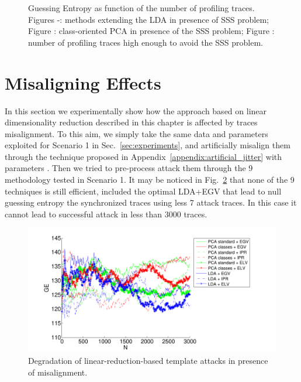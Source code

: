 \begin{figure}
\caption[Guessing Entropy as function of the number of profiling traces.]{Guessing Entropy as function of the number of profiling traces. Figures -: methods extending the LDA in presence of SSS problem; Figure : class-oriented PCA in presence of the SSS problem; Figure : number of profiling traces high enough to avoid the SSS problem.}\label{fig:scenario2}
\end{figure}

\section{Misaligning Effects}\label{sec:misalignment}
In this section we experimentally show how the approach based on linear dimensionality reduction described in this chapter is affected by traces misalignment. To this aim, we simply take the same data and parameters exploited for Scenario 1 in Sec.~\ref{sec:experiments}, and artificially misalign them through the technique proposed in Appendix~\ref{appendix:artificial_jitter} with parameters . Then we tried to pre-process attack them through the 9 methodology tested in Scenario 1. It may be noticed in Fig.~\ref{fig:PCA_LDA_misalignment} that none of the 9 techniques is still efficient, included the optimal LDA+EGV that lead to null guessing entropy the synchronized traces using less 7 attack traces. In this case it cannot lead to successful attack in less than 3000 traces.
\begin{figure}
\includegraphics[width=\textwidth]{../Figures/desynchro_results_PCA_LDA.pdf} 
\caption{Degradation of linear-reduction-based template attacks in presence of misalignment.}\label{fig:PCA_LDA_misalignment}
\end{figure}